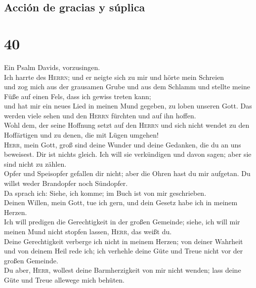 \hypertarget{acciuxf3n-de-gracias-y-suxfaplica}{%
\subsection{Acción de gracias y
súplica}\label{acciuxf3n-de-gracias-y-suxfaplica}}

\hypertarget{section-39}{%
\section{40}\label{section-39}}

 Ein Psalm Davids, vorzusingen.\\
 Ich harrte des \textsc{Herrn}; und er neigte sich zu mir
und hörte mein Schreien\\
 und zog mich aus der grausamen Grube und aus dem Schlamm
und stellte meine Füße auf einen Fels, dass ich gewiss treten kann;\\
 und hat mir ein neues Lied in meinen Mund gegeben, zu
loben unseren Gott. Das werden viele sehen und den \textsc{Herrn}
fürchten und auf ihn hoffen.\\
 Wohl dem, der seine Hoffnung setzt auf den \textsc{Herrn}
und sich nicht wendet zu den Hoffärtigen und zu denen, die mit Lügen
umgehen!\\
 \textsc{Herr}, mein Gott, groß sind deine Wunder und
deine Gedanken, die du an uns beweisest. Dir ist nichts gleich. Ich will
sie verkündigen und davon sagen; aber sie sind nicht zu zählen.\\
 Opfer und Speisopfer gefallen dir nicht; aber die Ohren
hast du mir aufgetan. Du willst weder Brandopfer noch Sündopfer.\\
 Da sprach ich: Siehe, ich komme; im Buch ist von mir
geschrieben.\\
 Deinen Willen, mein Gott, tue ich gern, und dein Gesetz
habe ich in meinem Herzen.\\
 Ich will predigen die Gerechtigkeit in der großen
Gemeinde; siehe, ich will mir meinen Mund nicht stopfen lassen,
\textsc{Herr}, das weißt du.\\
 Deine Gerechtigkeit verberge ich nicht in meinem Herzen;
von deiner Wahrheit und von deinem Heil rede ich; ich verhehle deine
Güte und Treue nicht vor der großen Gemeinde.\\
 Du aber, \textsc{Herr}, wollest deine Barmherzigkeit von
mir nicht wenden; lass deine Güte und Treue allewege mich behüten.\\
